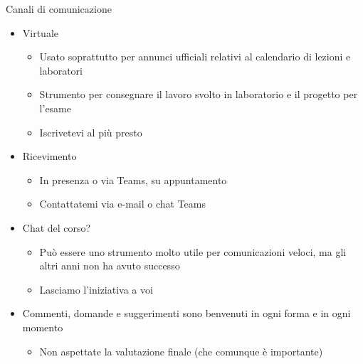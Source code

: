 \begin{frame}{Canali di comunicazione}

  \begin{itemize}[<+->]
  \item Virtuale

    \begin{itemize}[<.->]
    \item Usato soprattutto per annunci ufficiali relativi al calendario di
      lezioni e laboratori
    \item Strumento per consegnare il lavoro svolto in laboratorio e il progetto
      per l'esame
    \item Iscrivetevi al più presto
    \end{itemize}

  \item Ricevimento

    \begin{itemize}[<.->]
    \item In presenza o via Teams, su appuntamento
    \item Contattatemi via e-mail o chat Teams
    \end{itemize}

  \item Chat del corso?

    \begin{itemize}[<.->]
    \item Può essere uno strumento molto utile per comunicazioni
      veloci, ma gli altri anni non ha avuto successo
    \item Lasciamo l'iniziativa a voi
    \end{itemize}

  \item Commenti, domande e suggerimenti sono benvenuti in ogni forma e in ogni
    momento
    \begin{itemize}[<.->]
    \item Non aspettate la valutazione finale (che comunque è importante)
    \end{itemize}

  \end{itemize}

\end{frame}

